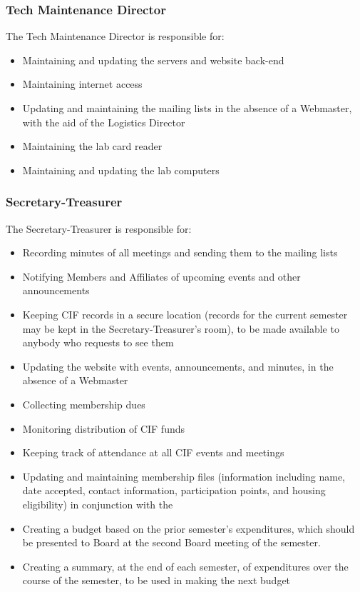 \documentclass[12pt]{amsart}
\begin{document}
		\subsubsection {Tech Maintenance Director}
The Tech Maintenance Director is responsible for:
\begin{itemize}
	\item Maintaining and updating the servers and website back-end
	\item Maintaining internet access
	\item Updating and maintaining the mailing lists in the absence of a Webmaster, with the aid of the Logistics Director
	\item Maintaining the lab card reader
	\item Maintaining and updating the lab computers
\end{itemize}
		\subsubsection {Secretary-Treasurer}
The Secretary-Treasurer is responsible for:
\begin{itemize}
	\item Recording minutes of all meetings and sending them to the mailing lists
	\item Notifying Members and Affiliates of upcoming events and other announcements
	\item Keeping CIF records in a secure location (records for the current semester may be kept in the Secretary-Treasurer's room), to be made available to anybody who requests to see them
	\item Updating the website with events, announcements, and minutes, in the absence of a Webmaster
	\item Collecting membership dues
	\item Monitoring distribution of CIF funds
	\item Keeping track of attendance at all CIF events and meetings
	\item Updating and maintaining membership files (information including name, date accepted, contact information, participation points, and housing eligibility) in conjunction with the
	\item Creating a budget based on the prior semester's expenditures, which should be presented to Board at the second Board meeting of the semester.
	\item Creating a summary, at the end of each semester, of expenditures over the course of the semester, to be used in making the next budget
\end{itemize}
\end{document}
